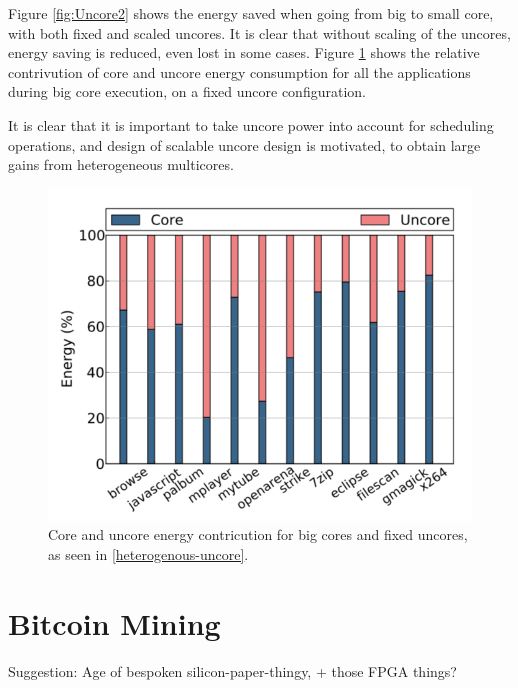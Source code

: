 Figure \ref{fig:Uncore2} shows the energy saved when going from big to small core, with both fixed and scaled uncores.
It is clear that without scaling of the uncores, energy saving is reduced, even lost in some cases.
Figure \ref{fig:Uncore3} shows the relative contrivution of core and uncore energy consumption for all the applications during big core execution, on a fixed uncore configuration.

It is clear that it is important to take uncore power into account for scheduling operations, and design of scalable uncore design is motivated, to obtain large gains from heterogeneous multicores. 

\begin{figure}[htb]
    \centering
    \includegraphics[width=1.0\textwidth]{Figures/Heterogeneous/Uncore3}
    \caption{Core and uncore energy contricution for big cores and fixed uncores, as seen in \ref{heterogenous-uncore}.}
    \label{fig:Uncore3}
\end{figure}




\section{Bitcoin Mining}

Suggestion: Age of bespoken silicon-paper-thingy, + those FPGA things?